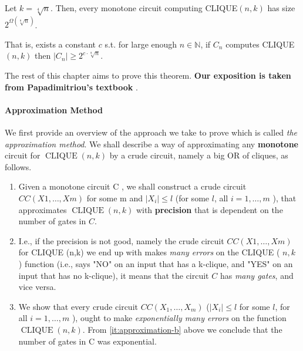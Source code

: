 \begin{svgraybox}
\begin{theorem}\label{thm:razborov} 
Let $k=\sqrt[4]{n}$. Then, every monotone circuit computing CLIQUE$(n, k)$ has size $2^{\Omega(\sqrt[8]{n})}$.
\end{theorem}
\end{svgraybox}
That is, exists a constant $c$ s.t. for large enough $n \in \mathbb{N}$, if $C_n$ computes CLIQUE$(n,k)$ then $\left|C_n\right| \geq 2^{c \cdot \sqrt[8]{n}}$.


The rest of this chapter aims to prove this theorem. \textbf{Our exposition is taken from Papadimitriou's textbook} \cite{Pap94}.





\paragraph{Approximation Method}

We first provide an overview of the approach we take to prove  which is called \emph{the approximation method}. 
We shall describe a way of approximating any \textbf{monotone} circuit for $\operatorname{CLIQUE}({n}, {k})$ by a crude circuit, namely a big OR of cliques, as follows.

\begin{enumerate}
    
\item  Given a monotone circuit C , we shall construct a crude circuit ${CC}({X} 1, \ldots, {Xm})$ for some m and $\left|{X}_{{i}}\right| \leq l$ (for some $l$, all ${i}=1, \ldots, {m}$ ), that approximates $\operatorname{CLIQUE}({n}, {k})$ with \textbf{precision} that is dependent on the number of gates in $C$.

\item I.e., if the precision is not good, namely the crude circuit ${CC}({X} 1, \ldots, {Xm})$ for CLIQUE (n,k) we end up with makes \textit{many errors} on the CLIQUE ( $n, k$ ) function (i.e., says "NO" on an input that has a k-clique, and "YES" on an input that has no k-clique), it means that the circuit $C$ has \textit{many gates}, and vice versa.\label{it:approximation-b}

\item We show that every crude circuit ${CC}({X}_1, \ldots, {X_m})$ ($|{X}_i| \leq l$ for some $l$, for all $i=1, \ldots, m$ ), ought to make \textit{exponentially many errors} on the function $\operatorname{CLIQUE}(n, k)$. From \ref{it:approximation-b} above we conclude that the number of gates in C was exponential.

\end{enumerate}


